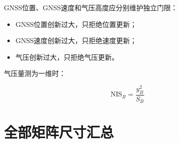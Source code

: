 \documentclass[12pt,a4paper]{ctexart}
\begin{document}
GNSS位置、GNSS速度和气压高度应分别维护独立门限：

\begin{itemize}[leftmargin=2em]
  \item GNSS位置创新过大，只拒绝位置更新；
  \item GNSS速度创新过大，只拒绝速度更新；
  \item 气压创新过大，只拒绝气压更新。
\end{itemize}

气压量测为一维时：

\[
\boxed{
\mathrm{NIS}_B
=
\frac{y_B^2}{S_B}
}
\]

\section{全部矩阵尺寸汇总}
\end{document}
